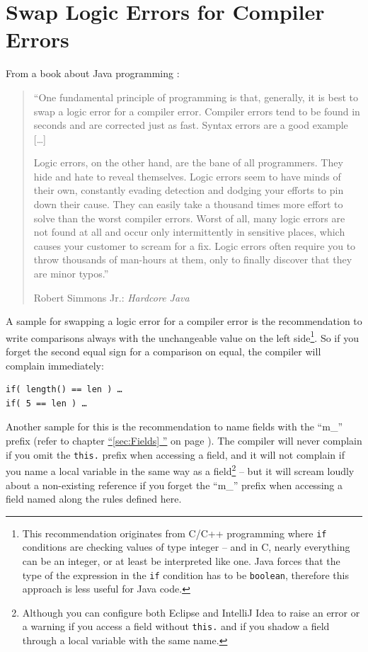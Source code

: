 \documentclass[11pt,a4paper, titlepage, parskip=half, headsepline, footsepline, cleardoublepage=current, headheight=1cm]{scrbook}
\newcommand*{\tqfullvref}[1]{\hyperref[{#1}]{“\ref*{#1} \nameref*{#1}”} on page \pageref{#1}}
\begin{document}
\section{Swap Logic Errors for Compiler Errors}
From a book about Java programming :
\begin{quotation}
“One fundamental principle of programming is that, generally, it is best to swap a logic error for a compiler error. Compiler errors tend to be found in seconds and are corrected just as fast. Syntax errors are a good example […]

Logic errors, on the other hand, are the bane of all programmers. They hide and hate to reveal themselves. Logic errors seem to have minds of their own, constantly evading detection and dodging your efforts to pin down their cause. They can easily take a thousand times more effort to solve than the worst compiler errors. Worst of all, many logic errors are not found at all and occur only intermittently in sensitive places, which causes your customer to scream for a fix. Logic errors often require you to throw thousands of man-hours at them, only to finally discover that they are minor typos.”

Robert Simmons Jr.: \textit{Hardcore Java}\autocite{Simmons:HARDCORE_JAVA}
\end{quotation}

A sample for swapping a logic error for a compiler error is the recommendation to write comparisons always with the unchangeable value on the left side\footnote{This recommendation originates from C/C++ programming where \lstinline|if| conditions are checking values of type integer – and in C, nearly everything can be an integer, or at least be interpreted like one. Java forces that the type of the expression in the \lstinline|if| condition has to be \lstinline|boolean|, therefore this approach is less useful for Java code.}. So if you forget the second equal sign for a comparison on equal, the compiler will complain immediately:
\begin{lstlisting}
if( length() == len ) …
if( 5 == len ) …
\end{lstlisting}

Another sample for this is the recommendation to name fields with the “m\_” prefix (refer to chapter \tqfullvref{sec:Fields}). The compiler will never complain if you omit the \lstinline|this.| prefix when accessing a field, and it will not complain if you name a local variable in the same way as a field\footnote{Although you can configure both Eclipse and IntelliJ Idea to raise an error or a warning if you access a field without \lstinline|this.| and if you shadow a field through a local variable with the same name.} – but it will scream loudly about a non-existing reference if you forget the “m\_” prefix when accessing a field named along the rules defined here.
\end{document}
